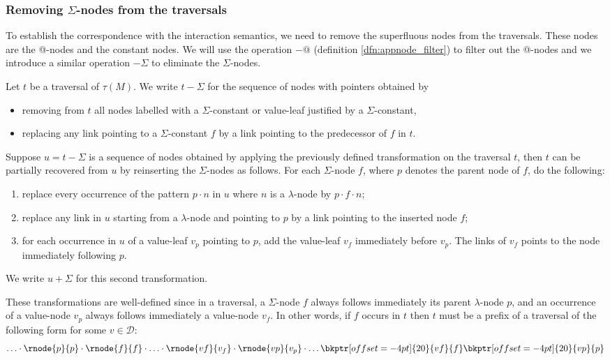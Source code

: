 \subsubsection{Removing $\Sigma$-nodes from the traversals}

To establish the correspondence with the interaction semantics, we need to remove the superfluous nodes
from the traversals. These nodes are the @-nodes and the constant nodes.
We will use the operation $-@$ (definition \ref{dfn:appnode_filter}) to filter out the @-nodes
and we introduce a similar operation $-\Sigma$ to eliminate the $\Sigma$-nodes.

\begin{dfn}
Let $t$ be a traversal of $\tau(M)$.
We write $t-\Sigma$ for the sequence of nodes with pointers
obtained by
\begin{itemize}
\item removing from $t$ all nodes labelled with a $\Sigma$-constant or value-leaf justified by a $\Sigma$-constant,
\item replacing any link pointing to a $\Sigma$-constant $f$
by a link pointing to the predecessor of $f$ in $t$.
\end{itemize}

Suppose $u = t-\Sigma$ is a sequence of nodes obtained by applying the
previously defined transformation on the traversal $t$, then $t$ can
be partially recovered from $u$ by reinserting the $\Sigma$-nodes as follows.
For each $\Sigma$-node $f$, where $p$ denotes the parent node of $f$, do the following:
    \begin{enumerate}
    \item replace every occurrence of the pattern $p \cdot n$ in $u$ where
    $n$ is a $\lambda$-node by $p \cdot f \cdot n$;

    \item replace any link in $u$ starting from a $\lambda$-node and pointing to $p$ by a link pointing to the inserted node $f$;

    \item for each occurrence in $u$ of a value-leaf $v_p$ pointing to $p$, add the value-leaf $v_f$
    immediately before $v_p$. The links of $v_f$ points to the node immediately following $p$.
    \end{enumerate}
We write $u+\Sigma$ for this second transformation.
\end{dfn}
These transformations are well-defined since in a traversal, a $\Sigma$-node $f$
always follows immediately its parent $\lambda$-node $p$, and an occurrence of a value-node $v_p$
always follows immediately a value-node $v_f$. In other words, if $f$ occurs in $t$ then $t$ must be
a prefix of a traversal of the following form for some $v \in \mathcal{D}$:
$$ \ldots \cdot \rnode{p}{p} \cdot \rnode{f}{f} \cdot \ldots \cdot \rnode{vf}{v_f} \cdot \rnode{vp}{v_p} \cdot \ldots
\bkptr[offset=-4pt]{20}{vf}{f}
\bkptr[offset=-4pt]{20}{vp}{p}
$$

